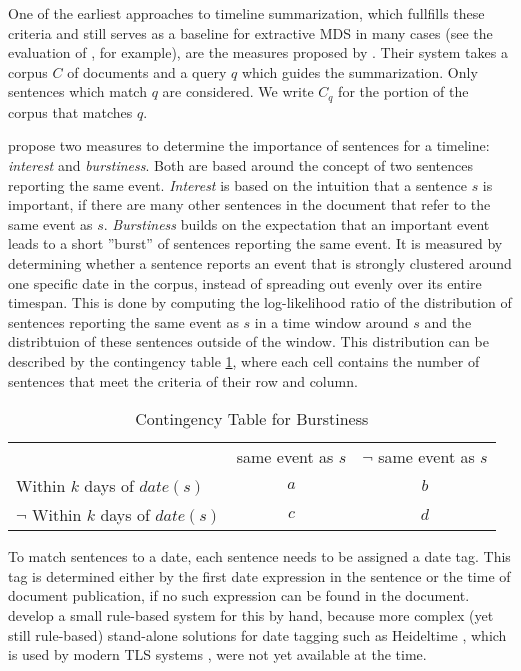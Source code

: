 \documentclass[a4paper,BCOR=10mm]{report}
\numberwithin{lemma}{chapter}
\numberwithin{definition}{chapter}
\begin{document}
One of the earliest approaches to timeline summarization, which fullfills these criteria and still serves as a baseline for extractive MDS in many cases (see the evaluation of \citet{markert}, for example), are the measures proposed by \citet{chieu}.
Their system takes a corpus $C$ of documents and a query $q$ which guides the summarization. Only sentences which match $q$ are considered. We write $C_q$ for the portion of the corpus that matches $q$.

\citeauthor{chieu} propose two measures to determine the importance of sentences for a timeline: \textit{interest} and \textit{burstiness}.
Both are based around the concept of two sentences reporting the same event. \textit{Interest} is based on the intuition that a sentence $s$ is important, if there are many other sentences in the document that refer to the same event as $s$. \textit{Burstiness} builds on the expectation that an important event leads to a short ''burst'' of sentences reporting the same event.
It is measured by determining whether a sentence reports an event that is strongly clustered around one specific date in the corpus, instead of spreading out evenly over its entire timespan. This is done by computing the log-likelihood ratio of the distribution of sentences reporting the same event as $s$ in a time window around $s$ and the distribtuion of these sentences outside of the window.
This distribution can be described by the contingency table \ref{tab:chieu}, where each cell contains the number of sentences that meet the criteria of their row and column.

\begin{table}
\begin{tabular}{|l|c|c|}
\hline
& same event as $s$ & $\lnot$ same event as $s$ \\
Within $k$ days of $\mathit{date}(s)$ & $a$ & $b$ \\
$\lnot$ Within $k$ days of $\mathit{date}(s)$ & $c$ & $d$ \\
\hline
\end{tabular}
\caption{Contingency Table for Burstiness}
\label{tab:chieu}
\end{table}

To match sentences to a date, each sentence needs to be assigned a date tag. This tag is determined either by the first date expression in the sentence or the time of document publication, if no such expression can be found in the document. \citeauthor{chieu} develop a small rule-based system for this by hand, because more complex (yet still rule-based) stand-alone solutions for date tagging such as Heideltime \citep{heideltime}, which is used by modern TLS systems \citep{tran-headlines, markert}, were not yet available at the time.
\end{document}
